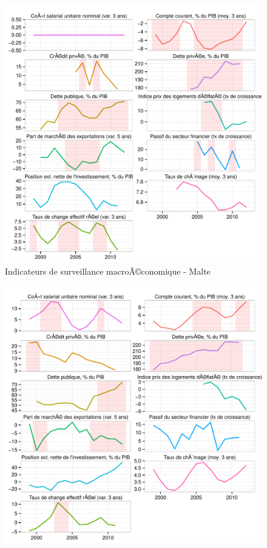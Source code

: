\documentclass{article}\usepackage[]{graphicx}\usepackage[]{color}
\makeatletter
\def\maxwidth{ %
  \ifdim\Gin@nat@width>\linewidth
    \linewidth
  \else
    \Gin@nat@width
  \fi
}
\newenvironment{knitrout}{}{} %
\makeatother
\begin{document}
\begin{knitrout}
\begin{figure}[p]
{\centering \includegraphics[width=\maxwidth]{figure_graph/byco20} 

}

\caption[Indicateurs de surveillance macroÃ©conomique - Malte]{Indicateurs de surveillance macroÃ©conomique - Malte\label{fig:byco20}}
\end{figure}

\begin{figure}[p]


{\centering \includegraphics[width=\maxwidth]{figure_graph/byco21} 

}
\end{figure}
\end{knitrout}
\end{document}
